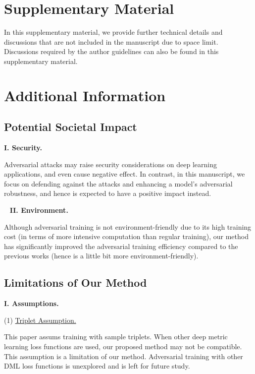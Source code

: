 \clearpage
\appendix

\section*{Supplementary Material}

In this supplementary material, we provide further technical details and
discussions that are not included in the manuscript due to space limit.
%
Discussions required by the author guidelines can also be found in this
supplementary material.

\tableofcontents

\section{Additional Information}
\label{sec:a}

\subsection{Potential Societal Impact}
\label{sec:a1}

\noindent\textbf{I. Security.}

Adversarial attacks may raise security considerations on
deep learning applications, and even cause negative effect.
%
In contrast, in this manuscript, we focus on defending against the attacks and
enhancing a model's adversarial robustness, and hence is expected to have a
positive impact instead.

~\newline
\noindent\textbf{II. Environment.}

Although adversarial training is not
environment-friendly due to its high training cost (in terms of more intensive
computation than regular training), our method has significantly improved the
adversarial training efficiency compared to the previous works (hence is a
little bit more environment-friendly).

\subsection{Limitations of Our Method}
\label{sec:a2}

\noindent\textbf{I. Assumptions.}

(1) \ul{Triplet Assumption.}

This paper assums training with sample triplets.
%
When other deep metric learning loss functions are used, our proposed method
may not be compatible.
%
This assumption is a limitation of our method.
%
Adversarial training with other DML loss functions is unexplored and is left
for future study.

